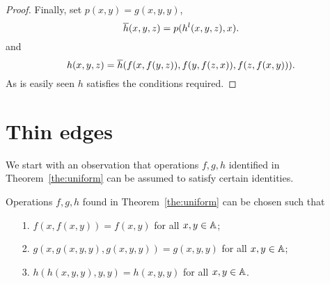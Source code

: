 \documentclass[11pt]{article}
\begin{document}
\begin{proof}
Finally, set $p(x,y)=g(x,y,y)$,
$$
\overline h(x,y,z)=p(h^l(x,y,z),x).
$$
and
$$
h(x,y,z)=\overline h(f(x,f(y,z)),f(y,f(z,x)),f(z,f(x,y))).
$$
As is easily seen $h$ satisfies the conditions required.
\end{proof}


\section{Thin edges}\label{sec:thin}

We start with an observation that operations $f,g,h$ identified in 
Theorem~\ref{the:uniform} can be assumed to satisfy certain identities.

\begin{lemma}\label{lem:fgh-identities}
Operations $f,g,h$ found in Theorem~\ref{the:uniform} can be chosen such that
\begin{itemize}
\item[1.]
$f(x,f(x,y))=f(x,y)$ for all $x,y\in{\mathbb A}$;
\item[2.]
$g(x,g(x,y,y),g(x,y,y))=g(x,y,y)$ for all $x,y\in{\mathbb A}$;
\item[3.]
$h(h(x,y,y),y,y)=h(x,y,y)$ for all $x,y\in{\mathbb A}$.
\end{itemize}
\end{lemma}
\end{document}
